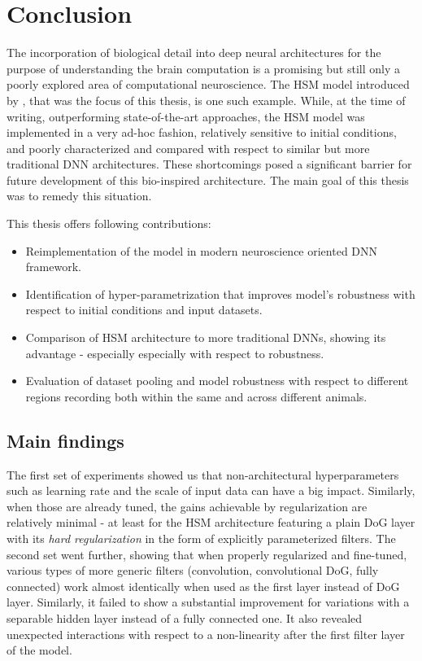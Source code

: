 \chapter*{Conclusion}\label{ch:6}
The incorporation of biological detail into deep neural architectures for the purpose of understanding the brain computation is a promising but still only a poorly explored area of computational neuroscience. The {HSM model} introduced by \cite{antolik}, that was the focus of this thesis, is one such example. While, at the time of writing, outperforming state-of-the-art approaches, the {HSM model} was implemented in a very ad-hoc fashion, relatively sensitive to initial conditions, and poorly characterized and compared with respect to similar but more traditional DNN architectures. These shortcomings posed a significant barrier for future development of this bio-inspired architecture. The main goal of this thesis was to remedy this situation. 

This thesis offers following contributions:

\begin{itemize}
    \item Reimplementation of the model in modern neuroscience oriented DNN\\ framework.
    \item Identification of hyper-parametrization that improves model’s robustness with respect to initial conditions and input datasets.
    \item Comparison of {HSM architecture} to more traditional DNNs, showing its advantage - especially especially with respect to robustness.
    \item Evaluation of dataset pooling and model robustness with respect to different regions recording both within the same and across different animals.
\end{itemize}

\section*{Main findings}

The first set of experiments showed us that non-architectural hyperparameters such as learning rate and the scale of input data can have a big impact. Similarly, when those are already tuned, the gains achievable by regularization are relatively minimal - at least for the {HSM architecture} featuring a plain DoG layer with its \textit{hard regularization} in the form of explicitly parameterized filters. The second set went further, showing that when properly regularized and fine-tuned, various types of more generic filters (convolution, convolutional DoG, fully connected) work almost identically when used as the first layer instead of DoG layer. Similarly, it failed to show a substantial improvement for variations with a separable hidden layer instead of a fully connected one. It also revealed unexpected interactions with respect to a non-linearity after the first filter layer of the model. 

